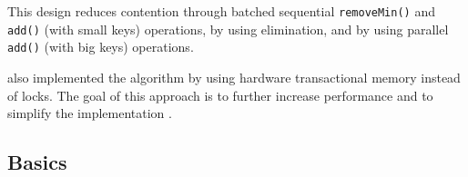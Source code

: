 This design reduces contention through batched sequential \texttt{removeMin()} and \texttt{add()} (with small keys) operations, by using elimination, and by using parallel \texttt{add()} (with big keys) operations. 

\citeauthor{calciu_adaptive_2014} also implemented the algorithm by using hardware transactional memory instead of locks. The goal of this approach is to further increase performance and to simplify the implementation \cite{calciu_adaptive_2014}.

\subsection{Basics}


